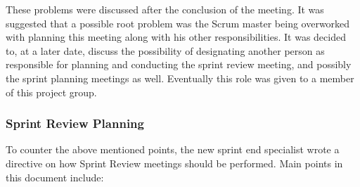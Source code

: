 These problems were discussed after the conclusion of the meeting. 
It was suggested that a possible root problem was the \giraf Scrum master being overworked with planning this meeting along with his other responsibilities.
It was decided to, at a later date, discuss the possibility of designating another person as responsible for planning and conducting the sprint review meeting, and possibly the sprint planning meetings as well. Eventually this role was given to a member of this project group.

\subsubsection{Sprint Review Planning}
To counter the above mentioned points, the new sprint end specialist wrote a directive on how Sprint Review meetings should be performed. Main points in this document include:
